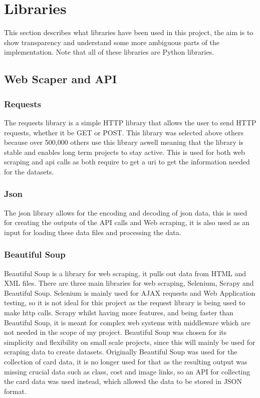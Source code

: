 \documentclass{report} %
\begin{document}
	\section{Libraries}
	This section describes what libraries have been used in this project, the aim is to show transparency and understand some more ambiguous parts of the implementation. Note that all of these libraries are Python libraries.
	\subsection{Web Scaper and API}
	\subsubsection{Requests}
	The requests library is a simple HTTP library that allows the user to send HTTP requests, whether it be GET or POST. This library was selected above others because over 500,000 others use this library aswell meaning that the library is stable and enables long term projects to stay active. This is used for both web scraping and api calls as both require to get a uri to get the information needed for the datasets.
	\subsubsection{Json}
	The json library allows for the encoding and decoding of json data, this is used for creating the outputs of the API calls and Web scraping, it is also used as an input for loading these data files and processing the data.
	\subsubsection{Beautiful Soup}
	Beautiful Soup is a library for web scraping, it pulls out data from HTML and XML files. There are three main libraries for web scraping, Selenium,  Scrapy and Beautiful Soup. Selenium is mainly used for AJAX requests and Web Application testing, so it is not ideal for this project as the request library is being used to make http calls. Scrapy whilst having more features, and being faster than Beautiful Soup, it is meant for complex web systems with middleware which are not needed in the scope of my project. Beautiful Soup was chosen for its simplicity and flexibility on small scale projects, since this will mainly be used for scraping data to create datasets. Originally Beautiful Soup was used for the collection of card data, it is no longer used for that as the resulting output was missing crucial data such as class, cost and image links, so an API for collecting the card data was used instead, which allowed the data to be stored in JSON format. 
\end{document}
